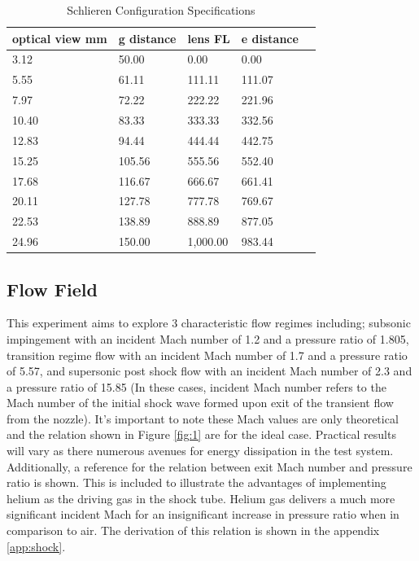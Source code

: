 \begin{table}[h]
	\centering
	\caption{Schlieren Configuration Specifications}
	\label{tab2}
	\begin{tabular}{@{}lllll@{}}
		\toprule
		optical view mm & g distance & lens FL  & e distance \\ \midrule
		3.12            & 50.00      & 0.00     & 0.00       \\
		5.55            & 61.11      & 111.11   & 111.07     \\
		7.97            & 72.22      & 222.22   & 221.96     \\
		10.40           & 83.33      & 333.33   & 332.56     \\
		12.83           & 94.44      & 444.44   & 442.75     \\
		15.25           & 105.56     & 555.56   & 552.40     \\
		17.68           & 116.67     & 666.67   & 661.41     \\
		20.11           & 127.78     & 777.78   & 769.67     \\
		22.53           & 138.89     & 888.89   & 877.05     \\
		24.96           & 150.00     & 1,000.00 & 983.44     \\ \bottomrule
	\end{tabular}
\end{table}

\subsection{Flow Field}
This experiment aims to explore 3 characteristic flow regimes including; subsonic impingement with an incident Mach number of 1.2 and a pressure ratio of 1.805, transition regime flow with an incident Mach number of 1.7 and a pressure ratio of 5.57, and supersonic post shock flow with an incident Mach number of 2.3 and a pressure ratio of 15.85 (In these cases, incident Mach number refers to the Mach number of the initial shock wave formed upon exit of the transient flow from the nozzle). It's important to note these Mach values are only theoretical and the relation shown in Figure \ref{fig:1} are for the ideal case. Practical results will vary as there numerous avenues for energy dissipation in the test system. Additionally, a reference for the relation between exit Mach number and pressure ratio is shown. This is included to illustrate the advantages of implementing helium as the driving gas in the shock tube. Helium gas delivers a much more significant incident Mach for an insignificant increase in pressure ratio when in comparison to air. The derivation of this relation is shown in the appendix \ref{app:shock}. 

